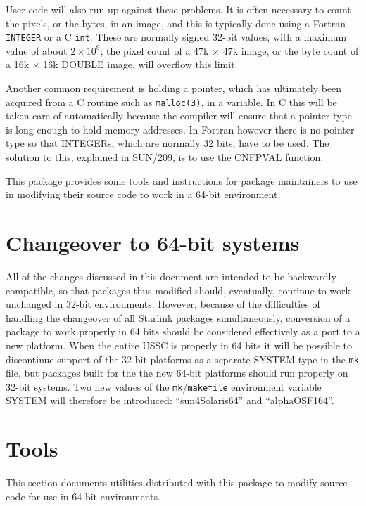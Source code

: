 \documentclass[twoside,11pt]{article}
\newcommand{\xref}[3]{#1}
\renewcommand{\_}{\texttt{\symbol{95}}}
\begin{document}
User code will also run up against these problems.
It is often necessary to count the pixels, or the bytes,
in an image, and this is typically done using a Fortran {\tt INTEGER}
or a C {\tt int}.  These are normally signed 32-bit values, with
a maximum value of about $2 \times 10^9$; the pixel count of a 
47k $\times$ 47k image, or the byte count of a 16k $\times$ 16k 
\_DOUBLE image, will overflow this limit.

Another common requirement is holding a pointer, which has ultimately been 
acquired from a C routine such as {\tt malloc(3)}, 
in a variable.
In C this will be taken care of automatically because the compiler
will ensure that a pointer type is long enough to hold memory addresses.
In Fortran however there is no pointer type so that INTEGERs, which are
normally 32 bits, have to be used.
The solution to this, explained in \xref{SUN/209}{sun209}{pointers},
is to use the \xref{CNF\_PVAL}{sun209}{CNF\_PVAL} function.

This package provides some tools and instructions for 
package maintainers to use 
in modifying their source code to work in a 64-bit environment.

\section{Changeover to 64-bit systems}

All of the changes discussed in this document
are intended to be backwardly compatible, 
so that packages thus modified should, eventually, 
continue to work unchanged in 32-bit environments.
However, because of the difficulties of handling the changeover of all 
Starlink packages simultaneously, conversion of a package
to work properly in 64 bits should be considered effectively as
a port to a new platform.  
When the entire USSC is properly in 64 bits it will be possible
to discontinue support of the 32-bit platforms as a separate SYSTEM
type in the {\tt mk} file, but packages built for the the new 
64-bit platforms should run properly on 32-bit systems.
Two new values of the {\tt mk}/{\tt makefile} environment variable 
SYSTEM will therefore be introduced: 
``sun4\_Solaris\_64'' and ``alpha\_OSF1\_64''.


\section{Tools}

This section documents utilities distributed with this package
to modify source code for use in 64-bit environments.
\end{document}
